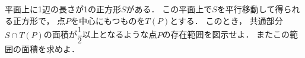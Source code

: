 \documentclass[../../main.tex]{subfiles}
\begin{document}
平面上に1辺の長さが1の正方形$S$がある．
この平面上で$S$を平行移動して得られる正方形で，
点$P$を中心にもつものを$T(P)$とする．
このとき，
共通部分$S \cap T (P)$の面積が$\displaystyle\dfrac{1}{2}$以上となるような点$P$の存在範囲を図示せよ．
またこの範囲の面積を求めよ．
\end{document}
